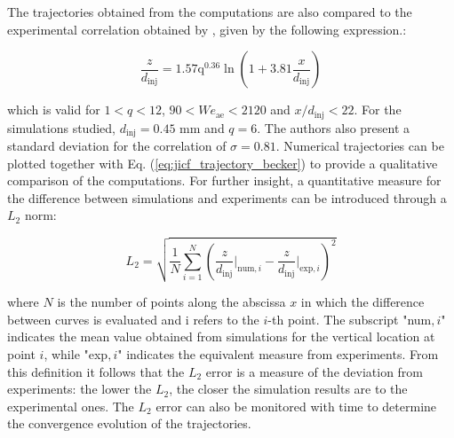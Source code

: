 

The trajectories obtained from the computations are also compared to the experimental correlation obtained by , given by the following expression.:

\begin{equation}
    \label{eq:jicf_trajectory_becker}
    \frac{z}{d_\mathrm{inj}} = 1.57 \mathrm{q}^{0.36} \ln \left( 1 + 3.81 \frac{x}{d_\mathrm{inj}} \right)
\end{equation}

which is valid for $1 < q < 12$, $90 < We_\mathrm{ae} < 2120$ and $x/d_\mathrm{inj} < 22$. For the simulations studied, $d_\mathrm{inj} = 0.45$ mm and $q = 6$. The authors also present a standard deviation for the correlation of $\sigma = 0.81$. Numerical trajectories can be plotted together with Eq. (\ref{eq:jicf_trajectory_becker}) to provide a qualitative comparison of the computations. For further insight, a quantitative measure for the difference between simulations and experiments can be introduced through a $L_2$ norm:

\begin{equation}
\label{eq:L2_JICF}
    L_2 = \sqrt{\frac{1}{N}   \sum_{i=1}^N \left( \frac{z}{d_\mathrm{inj}} \Bigr|_{\mathrm{num},i} -   \frac{z}{d_\mathrm{inj}} \Bigr|_{\mathrm{exp},i} \right)^2}
\end{equation}

where $N$ is the number of points along the abscissa $x$ in which the difference between curves is evaluated and i refers to the $i$-th point. The subscript "num$,i$" indicates the mean value obtained from simulations for the vertical location at point $i$, while "exp$,i$" indicates the equivalent measure from experiments. From this definition it follows that the $L_2$ error is a measure of the deviation from experiments: the lower the $L_2$, the closer the simulation results are to the experimental ones. The $L_2$ error can also be monitored with time to determine the convergence evolution of the trajectories. \\

